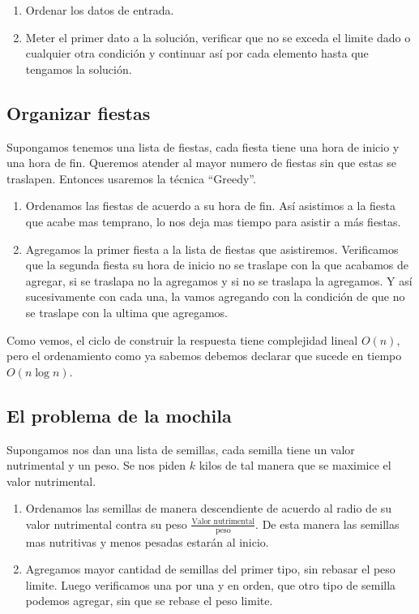 \begin{enumerate}
    \item Ordenar los datos de entrada.
    \item Meter el primer dato a la solución, verificar que no se exceda el limite dado o cualquier otra condición y continuar así por cada elemento hasta que tengamos la solución.
\end{enumerate}

\subsection{Organizar fiestas}

Supongamos tenemos una lista de fiestas, cada fiesta tiene una hora de inicio y una hora de fin. Queremos atender al mayor numero de fiestas sin que estas se traslapen. Entonces usaremos la técnica ``Greedy''.

\begin{enumerate}
    \item Ordenamos las fiestas de acuerdo a su hora de fin. Así asistimos a la fiesta que acabe mas temprano, lo nos deja mas tiempo para asistir a más fiestas.
    \item Agregamos la primer fiesta a la lista de fiestas que asistiremos. Verificamos que la segunda fiesta su hora de inicio no se traslape con la que acabamos de agregar, si se traslapa no la agregamos y si no se traslapa la agregamos. Y así sucesivamente con cada una, la vamos agregando con la condición de que no se traslape con la ultima que agregamos.
\end{enumerate}

Como vemos, el ciclo de construir la respuesta tiene complejidad lineal $O(n)$, pero el ordenamiento como ya sabemos debemos declarar que sucede en tiempo $O(n \log n)$.

\subsection{El problema de la mochila}

Supongamos nos dan una lista de semillas, cada semilla tiene un valor nutrimental y un peso. Se nos piden $k$ kilos de tal manera que se maximice el valor nutrimental.

\begin{enumerate}
    \item Ordenamos las semillas de manera descendiente de acuerdo al radio de su valor nutrimental contra su peso $\frac{\text{Valor nutrimental}}{\text{peso}}$. De esta manera las semillas mas nutritivas y menos pesadas estarán al inicio. 
    \item Agregamos mayor cantidad de semillas del primer tipo, sin rebasar el peso limite. Luego verificamos una por una y en orden, que otro tipo de semilla podemos agregar, sin que se rebase el peso limite.
\end{enumerate}

